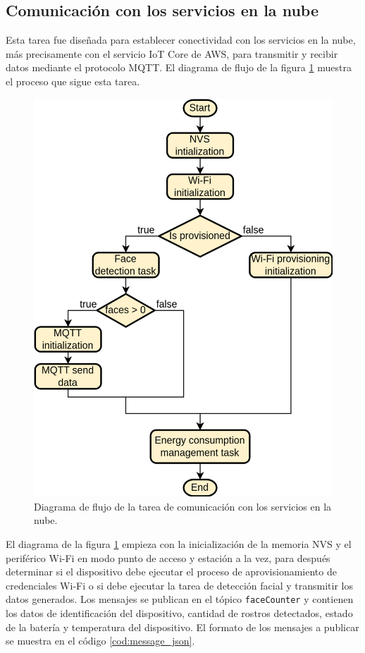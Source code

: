 \subsection{Comunicación con los servicios en la nube}
Esta tarea fue diseñada para establecer conectividad con los servicios en la nube, más precisamente con el servicio IoT Core de AWS, para transmitir y recibir datos mediante el protocolo MQTT. El diagrama de flujo de la figura \ref{fig:fw_comm_flow} muestra el proceso que sigue esta tarea.

\begin{figure}[h]
	\centering
	\includegraphics[scale=0.22]{./Figures/fw_comm_flow.png}
	\caption{Diagrama de flujo de la tarea de comunicación con los servicios en la nube.}
	\label{fig:fw_comm_flow}
\end{figure}

El diagrama de la figura \ref{fig:fw_comm_flow} empieza con la inicialización de la memoria NVS y el periférico Wi-Fi en modo punto de acceso y estación a la vez, para después determinar si el dispositivo debe ejecutar el proceso de aprovisionamiento de credenciales Wi-Fi o si debe ejecutar la tarea de detección facial y transmitir los datos generados. Los mensajes se publican en el tópico \texttt{faceCounter} y contienen los datos de identificación del dispositivo, cantidad de rostros detectados, estado de la batería y temperatura del dispositivo. El formato de los mensajes a publicar se muestra en el código \ref{cod:message_json}.

